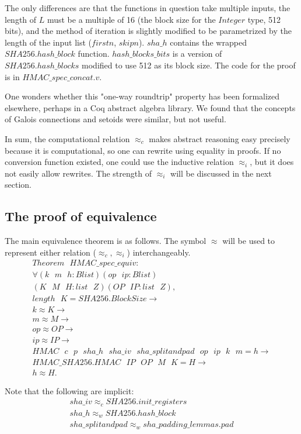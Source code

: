 \documentclass[twocolumn,showpacs,%
  nofootinbib,aps,superscriptaddress,%
  eqsecnum,prd,notitlepage,showkeys,10pt]{revtex4-1}
\newcommand{\eqn}[1] {\begin{gather*}#1\end{gather*}}
\newcommand{\s} {\textrm{ }}
\begin{document}
The only differences are that the functions in question take multiple inputs, the length of $L$ must be a multiple of 16 (the block size for the $Integer$ type, 512 bits), and the method of iteration is slightly modified to be parametrized by the length of the input list ($firstn$, $skipn$). $sha\_h$ contains the wrapped $SHA256.hash\_block$ function. $hash\_blocks\_bits$ is a version of $SHA256.hash\_blocks$ modified to use 512 as its block size. The code for the proof is in $HMAC\_spec\_concat.v$.

One wonders whether this "one-way roundtrip" property has been formalized elsewhere, perhaps in a Coq abstract algebra library. We found that the concepts of Galois connections and setoids were similar, but not useful.

In sum, the computational relation $\approx_c$ makes abstract reasoning easy precisely because it is computational, so one can rewrite using equality in proofs. If no conversion function existed, one could use the inductive relation $\approx_i$, but it does not easily allow rewrites. The strength of $\approx_i$ will be discussed in the next section.

\subsection{The proof of equivalence}

The main equivalence theorem is as follows. The symbol $\approx$ will be used to represent either relation ($\approx_c, \approx_i$) interchangeably. 
\eqn{
Theorem \s HMAC\_spec\_equiv : \\
\forall
                            (k \s m \s h : Blist) (op \s ip : Blist) \\
                            (K \s M \s H : list \s Z) (OP \s IP : list \s Z), \\
  length \s K = SHA256.BlockSize \rightarrow \\
  k \approx K \rightarrow \\
  m \approx M \rightarrow \\
  op \approx OP \rightarrow \\
  ip \approx IP \rightarrow \\
  HMAC \s c \s p \s sha\_h \s sha\_iv \s sha\_splitandpad \s op \s ip \s k \s m = h \rightarrow \\
  HMAC\_SHA256.HMAC \s IP \s OP \s M \s K = H \rightarrow \\
  h \approx H.
}

Note that the following are implicit: 
\eqn{
	sha\_iv \approx_c SHA256.init\_registers \\
	sha\_h \approx_w SHA256.hash\_block \\
	sha\_splitandpad \approx_w sha\_padding\_lemmas.pad
}
\end{document}
